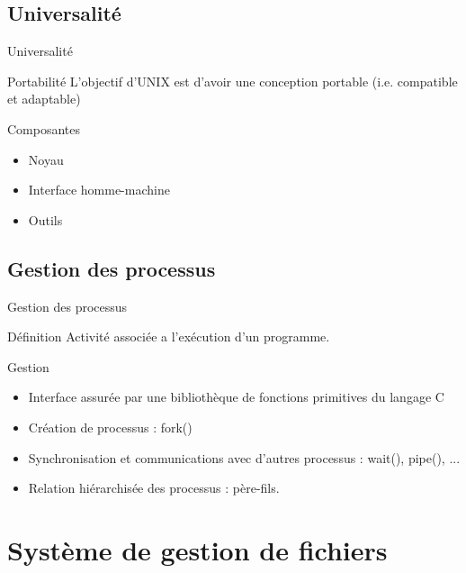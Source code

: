 \subsection{Universalité}
\begin{frame}{Universalité}
\begin{alertblock}{Portabilité}
L'objectif d'UNIX est d'avoir une conception portable (i.e. compatible et adaptable)
\end{alertblock}

\begin{block}{Composantes}
\begin{itemize}
\item Noyau
\item Interface homme-machine
\item Outils
\end{itemize}
\end{block}
\end{frame}

\subsection{Gestion des processus}
\begin{frame}{Gestion des processus}
\begin{alertblock}{Définition}
Activité associée a l'exécution d'un programme.
\end{alertblock}

\begin{block}{Gestion}

\begin{itemize}
\item Interface assurée par une bibliothèque de fonctions primitives du langage C
\item Création de processus : fork()
\item Synchronisation et communications avec d'autres processus : wait(), pipe(), ...
\item Relation hiérarchisée des processus : père-fils.
\end{itemize}
\end{block}
\end{frame}



\section{Système de gestion de fichiers}
